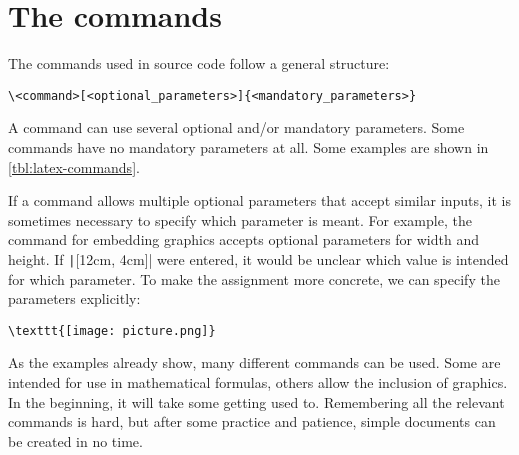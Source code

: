 \section{The commands}
\label{subsec:command-structure}
The commands used in source code follow a general structure:
\begin{verbatim}
\<command>[<optional_parameters>]{<mandatory_parameters>}
\end{verbatim}
A command can use several optional and/or mandatory parameters. 
Some commands have no mandatory parameters at all. 
Some examples are shown in \cref{tbl:latex-commands}.

\begin{table}[h!]
	\caption{Examples for \LaTeX-commands}
	\label{tbl:latex-commands}
\end{table}

If a command allows multiple optional parameters that accept similar inputs, it is sometimes necessary to specify which parameter is meant. 
For example, the command for embedding graphics accepts optional parameters for width and height. 
If \texttt|[12cm, 4cm]| were entered, it would be unclear which value is intended for which parameter. 
To make the assignment more concrete, we can specify the parameters explicitly:
\begin{verbatim}
\texttt{[image: picture.png]}
\end{verbatim}

As the examples already show, many different commands can be used. 
Some are intended for use in mathematical formulas, others allow the inclusion of graphics. 
In the beginning, it will take some getting used to. 
Remembering all the relevant commands is hard, but after some practice and patience, simple documents can be created in no time.